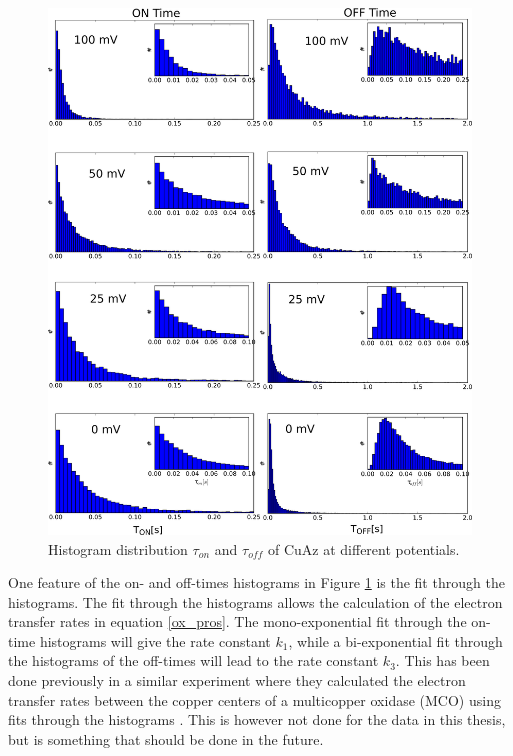 \documentclass[twoside,single]{lion-msc}
\begin{document}
\begin{figure}[ht!]
\centering
\includegraphics[width=.9\textwidth]{Figure_4_4_histogram_thesis}
\caption{Histogram distribution $\tau_{on}$ and $\tau_{off}$ of CuAz at different potentials.}
\label{histograms_disc}
\end{figure}

One feature of the on- and off-times histograms in Figure \ref{histograms_disc} is the fit through the histograms. The fit through the histograms allows the calculation of the electron transfer rates in equation \ref{ox_pros}. The mono-exponential fit through the on-time histograms will give the rate constant $k_{1}$, while a bi-exponential fit through the histograms of the off-times will lead to the rate constant $k_{3}$. This has been done previously in a similar experiment where they calculated the electron transfer rates  between the copper centers of a multicopper oxidase (MCO) using fits through the histograms \cite{Gupta2014a}. This is however not done for the data in this thesis, but is something that should be done in the future.
\end{document}
